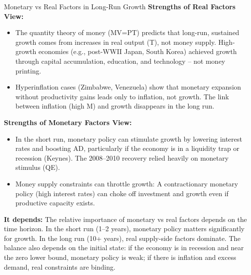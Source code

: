 \documentclass[11pt, a4paper, twoside]{book}
\begin{document}
\begin{evaluation}{Monetary vs Real Factors in Long-Run Growth}
\textbf{Strengths of Real Factors View:}
\begin{itemize}
  \item The quantity theory of money (MV=PT) predicts that long-run, sustained growth comes from increases in real output (T), not money supply. High-growth economies (e.g., post-WWII Japan, South Korea) achieved growth through capital accumulation, education, and technology -- not money printing.
  \item Hyperinflation cases (Zimbabwe, Venezuela) show that monetary expansion without productivity gains leads only to inflation, not growth. The link between inflation (high M) and growth disappears in the long run.
\end{itemize}

\textbf{Strengths of Monetary Factors View:}
\begin{itemize}
  \item In the short run, monetary policy can stimulate growth by lowering interest rates and boosting AD, particularly if the economy is in a liquidity trap or recession (Keynes). The 2008--2010 recovery relied heavily on monetary stimulus (QE).
  \item Money supply constraints can throttle growth: A contractionary monetary policy (high interest rates) can choke off investment and growth even if productive capacity exists.
\end{itemize}

\textbf{It depends:}
The relative importance of monetary vs real factors depends on the time horizon. In the short run (1--2 years), monetary policy matters significantly for growth. In the long run (10+ years), real supply-side factors dominate. The balance also depends on the initial state: if the economy is in recession and near the zero lower bound, monetary policy is weak; if there is inflation and excess demand, real constraints are binding.
\end{evaluation}
\end{document}
